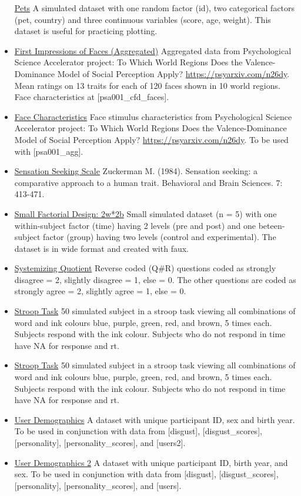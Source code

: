 \documentclass[
  oneside]{book}
\begin{document}
\begin{itemize}
  \href{data/pets.csv}{Pets} A simulated dataset with one random factor (id), two categorical factors (pet, country) and three continuous variables (score, age, weight). This dataset is useful for practicing plotting.
\item
  \href{data/psa001_agg.csv}{First Impressions of Faces (Aggregated)} Aggregated data from Psychological Science Accelerator project: To Which World Regions Does the Valence-Dominance Model of Social Perception Apply? \url{https://psyarxiv.com/n26dy}. Mean ratings on 13 traits for each of 120 faces shown in 10 world regions. Face characteristics at {[}psa001\_cfd\_faces{]}.
\item
  \href{data/psa001_cfd_faces.csv}{Face Characteristics} Face stimulus characteristics from Psychological Science Accelerator project: To Which World Regions Does the Valence-Dominance Model of Social Perception Apply? \url{https://psyarxiv.com/n26dy}. To be used with {[}psa001\_agg{]}.
\item
  \href{data/sensation_seeking.csv}{Sensation Seeking Scale} Zuckerman M. (1984). Sensation seeking: a comparative approach to a human trait. Behavioral and Brain Sciences. 7: 413-471.
\item
  \href{data/smalldata.csv}{Small Factorial Design: 2w*2b} Small simulated dataset (n = 5) with one within-subject factor (time) having 2 levels (pre and post) and one beteen-subject factor (group) having two levels (control and experimental). The dataset is in wide format and created with faux.
\item
  \href{data/sq_data.csv}{Systemizing Quotient} Reverse coded (Q\#R) questions coded as strongly disagree = 2, slightly disagree = 1, else = 0. The other questions are coded as strongly agree = 2, slightly agree = 1, else = 0.
\item
  \href{data/stroop.csv}{Stroop Task} 50 simulated subject in a stroop task viewing all combinations of word and ink colours blue, purple, green, red, and brown, 5 times each. Subjects respond with the ink colour. Subjects who do not respond in time have NA for response and rt.
\item
  \href{data/stroop.xlsx}{Stroop Task} 50 simulated subject in a stroop task viewing all combinations of word and ink colours blue, purple, green, red, and brown, 5 times each. Subjects respond with the ink colour. Subjects who do not respond in time have NA for response and rt.
\item
  \href{data/users.csv}{User Demographics} A dataset with unique participant ID, sex and birth year. To be used in conjunction with data from {[}disgust{]}, {[}disgust\_scores{]}, {[}personality{]}, {[}personality\_scores{]}, and {[}users2{]}.
\item
  \href{data/users2.csv}{User Demographics 2} A dataset with unique participant ID, birth year, and sex. To be used in conjunction with data from {[}disgust{]}, {[}disgust\_scores{]}, {[}personality{]}, {[}personality\_scores{]}, and {[}users{]}.
\end{itemize}
\end{document}
